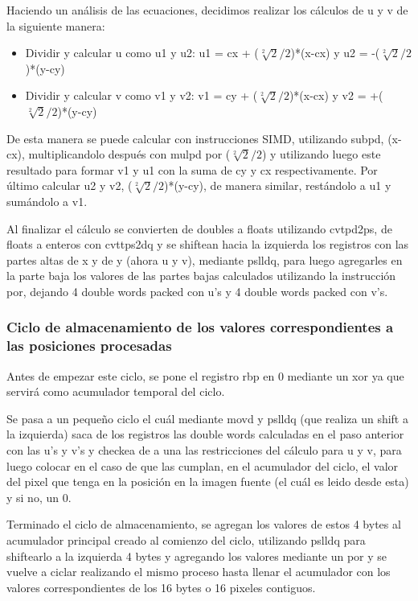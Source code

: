 Haciendo un análisis de las ecuaciones, decidimos realizar los cálculos de u y v de la siguiente manera:
\begin{itemize}
\item Dividir y calcular u como u1 y u2: u1 = cx + ($\sqrt[2]{2}/2$)*(x-cx) y u2 = -($\sqrt[2]{2}/2$)*(y-cy)
\item Dividir y calcular v como v1 y v2: v1 = cy + ($\sqrt[2]{2}/2$)*(x-cx) y v2 = +($\sqrt[2]{2}/2$)*(y-cy)
\end{itemize}

De esta manera se puede calcular con instrucciones SIMD, utilizando subpd, (x-cx), multiplicandolo después con mulpd por ($\sqrt[2]{2}/2$) y utilizando luego este resultado para formar v1 y u1 con la suma de cy y cx respectivamente. Por último calcular u2 y v2, ($\sqrt[2]{2}/2$)*(y-cy), de manera similar, restándolo a u1 y sumándolo a v1.

Al finalizar el cálculo se convierten de doubles a floats utilizando cvtpd2ps, de floats a enteros con cvttps2dq y se shiftean hacia la izquierda los registros con las partes altas de x y de y (ahora u y v), mediante pslldq, para luego agregarles en la parte baja los valores de las partes bajas calculados utilizando la instrucción por, dejando 4 double words packed con u's y 4 double words packed con v's.

\subsubsection{Ciclo de almacenamiento de los valores correspondientes a las posiciones procesadas}
Antes de empezar este ciclo, se pone el registro rbp en 0 mediante un xor ya que servirá como acumulador temporal del ciclo.

Se pasa a un pequeño ciclo el cuál mediante movd y pslldq (que realiza un shift a la izquierda) saca de los registros las double words calculadas en el paso anterior con las u's y v's y checkea de a una las restricciones del cálculo para u y v, para luego colocar en el caso de que las cumplan, en el acumulador del ciclo, el valor del pixel que tenga en la posición en la imagen fuente (el cuál es leido desde esta) y si no, un 0.

Terminado el ciclo de almacenamiento, se agregan los valores de estos 4 bytes al acumulador principal creado al comienzo del ciclo, utilizando pslldq para shiftearlo a la izquierda 4 bytes y agregando los valores mediante un por y se vuelve a ciclar realizando el mismo proceso hasta llenar el acumulador con los valores correspondientes de los 16 bytes o 16 pixeles contiguos.

